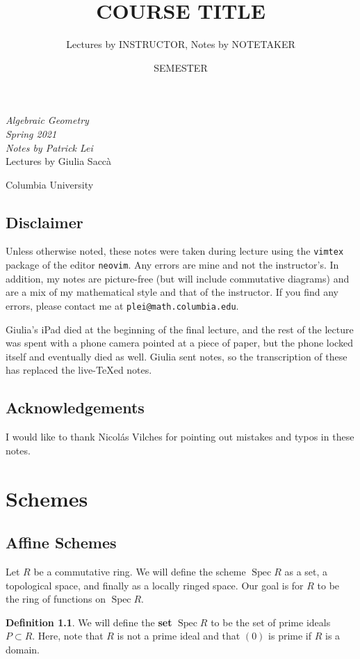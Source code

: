 \documentclass[leqno, openany]{memoir}
\title{COURSE TITLE}
\author{Lectures by INSTRUCTOR, Notes by NOTETAKER}
\date{SEMESTER}
\theoremstyle{definition}
\newtheorem{defn}[thm]{Definition}
\theoremstyle{remark}
\theoremstyle{plain}
\theoremstyle{definition}
\theoremstyle{remark}
\DeclareMathOperator{\Spec}{Spec}
\newcommand*{\titleSW}
    {\begingroup%
    \raggedleft
    \vspace*{\baselineskip}
    {\Huge\itshape Algebraic Geometry \\ Spring 2021}\\[\baselineskip]
    {\large\itshape Notes by Patrick Lei}\\[0.2\textheight]
    {\Large Lectures by Giulia Sacc\`a}\par
    \vfill
    {\Large \sffamily Columbia University}
    \vspace*{\baselineskip}
\endgroup}
\begin{document}
    
\begin{titlingpage}
\titleSW
\end{titlingpage}

\thispagestyle{empty}
\section*{Disclaimer}%
\label{sec:disclaimer}

Unless otherwise noted, these notes were taken during lecture using the
\texttt{vimtex} package of the editor \texttt{neovim}.  Any errors are mine and
not the instructor's.  In addition, my notes are picture-free (but will include
commutative diagrams) and are a mix of my mathematical style and that of the
instructor.  If you find any errors, please contact me at
\texttt{plei@math.columbia.edu}.

Giulia's iPad died at the beginning of the final lecture, and the rest of the
lecture was spent with a phone camera pointed at a piece of paper, but the
phone locked itself and eventually died as well. Giulia sent notes, so the
transcription of these has replaced the live-{\TeX}ed notes.

\section*{Acknowledgements}%

I would like to thank Nicol\'as Vilches for pointing out mistakes and typos in
these notes.

\newpage

\tableofcontents

\chapter{Schemes}%

\section{Affine Schemes}%

Let $R$ be a commutative ring. We will define the scheme $\Spec R$ as a set, a
topological space, and finally as a locally ringed space. Our goal is for $R$
to be the ring of functions on $\Spec R$.

\begin{defn} We will define the \textbf{set} $\Spec R$ to be the set of prime
ideals $P \subset R$. Here, note that $R$ is not a prime ideal and that $(0)$
is prime if $R$ is a domain.  \end{defn}
\end{document}
